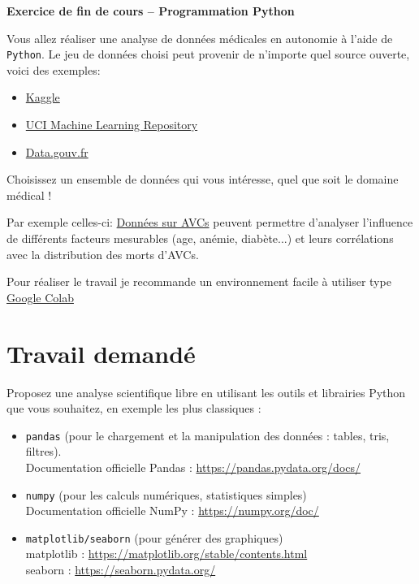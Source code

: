 \documentclass[12pt,a4paper]{article}
\begin{document}
\begin{center}
\Large \textbf{Exercice de fin de cours – Programmation Python}\\[0.5em]
\end{center}

Vous allez réaliser une analyse de données médicales en autonomie à l’aide de \texttt{Python}.  
Le jeu de données choisi peut provenir de n'importe quel source ouverte, voici des exemples:
\begin{itemize}
    \item \href{https://www.kaggle.com/datasets}{Kaggle}
    \item \href{https://archive.ics.uci.edu/datasets}{UCI Machine Learning Repository}
    \item \href{https://data.gouv.fr/}{Data.gouv.fr}
\end{itemize}
Choisissez un ensemble de données qui vous intéresse, quel que soit le domaine médical !

Par exemple celles-ci: \href{https://www.kaggle.com/datasets/andrewmvd/heart-failure-clinical-data/data?select=heart_failure_clinical_records_dataset.csv}{Données sur AVCs} peuvent permettre d'analyser l'influence de différents facteurs mesurables (age, anémie, diabète...) et leurs corrélations avec la distribution des morts d'AVCs.

Pour réaliser le travail je recommande un environnement facile à utiliser type \href{https://colab.research.google.com/}{Google Colab}

\section*{Travail demandé}

Proposez une analyse scientifique libre en utilisant les outils et librairies Python que vous souhaitez, en exemple les plus classiques :
\begin{itemize}
    \item \texttt{pandas} (pour le chargement et la manipulation des données : tables, tris, filtres). \\
          Documentation officielle Pandas : \href{https://pandas.pydata.org/docs/}{https://pandas.pydata.org/docs/}
    \item \texttt{numpy} (pour les calculs numériques, statistiques simples) \\
          Documentation officielle NumPy : \href{https://numpy.org/doc/}{https://numpy.org/doc/}
    \item \texttt{matplotlib/seaborn} (pour générer des graphiques) \\
          matplotlib : \href{https://matplotlib.org/stable/contents.html}{https://matplotlib.org/stable/contents.html} \\
          seaborn : \href{https://seaborn.pydata.org/}{https://seaborn.pydata.org/}
\end{itemize}
\end{document}
